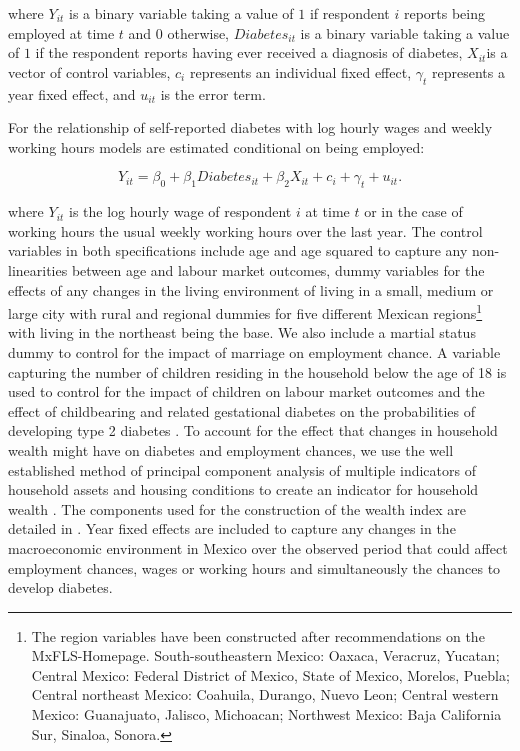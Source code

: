 where $Y_{it}$ is a binary variable taking a value of $1$ if respondent
$i$ reports being employed at time $t$ and $0$ otherwise, $Diabetes_{it}$
is a binary variable taking a value of $1$ if the respondent reports
having ever received a diagnosis of diabetes, $X_{it}$is a vector
of control variables, $c_{i}$ represents an individual fixed effect,
$\gamma_{t}$ represents a year fixed effect, and $u_{it}$ is the
error term.

For the relationship of self-reported diabetes with log hourly wages
 and weekly working hours models are estimated conditional on being
employed:

\noindent 
\begin{equation}
Y_{it}=\beta_{0}+\beta_{1}Diabetes_{it}+\beta_{2}X_{it}+c_{i}+\gamma_{t}+u_{it}.\label{eq:income_working-hours}
\end{equation}


where $Y_{it}$ is the log hourly wage of respondent $i$ at time
$t$ or in the case of working hours the usual weekly working hours
over the last year. The control variables in both specifications include
age and age squared to capture any non-linearities between age and
labour market outcomes, dummy variables for the effects of any changes
in the living environment of living in a small, medium or large city
with rural and regional dummies for five different Mexican regions\footnote{The region variables have been constructed after recommendations on
the MxFLS-Homepage. South-southeastern Mexico: Oaxaca, Veracruz, Yucatan;
Central Mexico: Federal District of Mexico, State of Mexico, Morelos,
Puebla; Central northeast Mexico: Coahuila, Durango, Nuevo Leon; Central
western Mexico: Guanajuato, Jalisco, Michoacan; Northwest Mexico:
Baja California Sur, Sinaloa, Sonora.} with living in the northeast being the base. We also include a martial
status dummy to control for the impact of marriage on employment chance.
A variable capturing the number of children residing in the household
below the age of 18 is used to control for the impact of children
on labour market outcomes and the effect of childbearing and related
gestational diabetes on the probabilities of developing type 2 diabetes
\citep{Bellamy2009}. To account for the effect that changes in household
wealth might have on diabetes and employment chances, we use the well
established method of principal component analysis of multiple indicators
of household assets and housing conditions to create an indicator
for household wealth \citep{Filmer2001}. The components used for
the construction of the wealth index are detailed in \citet{Seuring2015}.
Year fixed effects are included to capture any changes in the macroeconomic
environment in Mexico over the observed period that could affect employment
chances, wages or working hours and simultaneously the chances to
develop diabetes.

